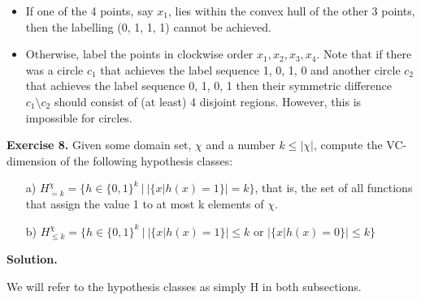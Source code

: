 \documentclass{article}
\newcommand{\<}{\langle}
\renewcommand{\>}{\rangle}
\theoremstyle{definition}
\begin{document}
\begin{itemize}
    \item If one of the 4 points, say $x_1$, lies within the convex hull of the other 3 points, then the labelling (0, 1, 1, 1) cannot be achieved.
    \item Otherwise, label the points in clockwise order $x_1, x_2, x_3, x_4$. Note that if there was a circle $c_1$ that achieves the label sequence 1, 0, 1, 0 and another circle $c_2$ that achieves the label sequence 0, 1, 0, 1 then their symmetric difference $c_1 \setminus c_2$ should consist of (at least) 4 disjoint regions. However, this is impossible for circles.
\end{itemize}

\textbf{Exercise 8.} Given some domain set, $\chi$ and a number $k \leq |\chi|$, compute the VC-dimension of the following hypothesis classes:

\begin{itemize}
    \item[a)] $H_{=k}^{\chi} = \{h \in \{0,1\}^k \ | \ |\{x|h(x) = 1\}| = k\}$, that is, the set of all functions that assign the value 1 to at most k elements of $\chi$.
    \item[b)] $H_{\leq k}^{\chi} = \{h \in \{0,1\}^k \ | \ |\{x|h(x) = 1\}| \leq k \text{ or } |\{x|h(x) = 0\}| \leq k \}$
\end{itemize}

\textbf{Solution.}

We will refer to the hypothesis classes as simply H in both subsections.
\end{document}
